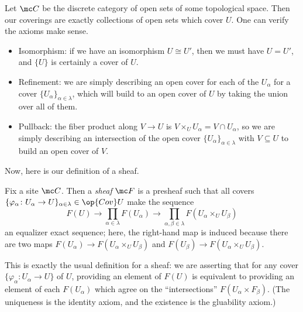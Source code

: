 \documentclass[../notes.tex]{subfiles}
\begin{document}
\begin{example}
	Let $\mc C$ be the discrete category of open sets of some topological space. Then our coverings are exactly collections of open sets which cover $U$. One can verify the axioms make sense.
	\begin{itemize}
		\item Isomorphism: if we have an isomorphism $U\cong U'$, then we must have $U=U'$, and $\{U\}$ is certainly a cover of $U$.
		\item Refinement: we are simply describing an open cover for each of the $U_\alpha$ for a cover $\{U_\alpha\}_{\alpha\in\lambda}$, which will build to an open cover of $U$ by taking the union over all of them.
		\item Pullback: the fiber product along $V\to U$ is $V\times_UU_\alpha=V\cap U_\alpha$, so we are simply describing an intersection of the open cover $\{U_\alpha\}_{\alpha\in\lambda}$ with $V\subseteq U$ to build an open cover of $V$.
	\end{itemize}
\end{example}
Now, here is our definition of a sheaf.
\begin{definition}[sheaf]
	Fix a site $\mc C$. Then a \textit{sheaf} $\mc F$ is a presheaf such that all covers $\{\varphi_\alpha\colon U_\alpha\to U\}_{\alpha\in\lambda}\in\op{Cov}U$ make the sequence
	\[F(U)\to\prod_{\alpha\in\lambda}F(U_\alpha)\to\prod_{\alpha,\beta\in\lambda}F(U_\alpha\times_UU_\beta)\]
	an equalizer exact sequence; here, the right-hand map is induced because there are two maps $F(U_\alpha)\to F(U_\alpha\times_UU_\beta)$ and $F(U_\beta)\to F(U_\alpha\times_UU_\beta)$.
\end{definition}
This is exactly the usual definition for a sheaf: we are asserting that for any cover $\{\varphi_\alpha\colon U_\alpha\to U\}$ of $U$, providing an element of $F(U)$ is equivalent to providing an element of each $F(U_\alpha)$ which agree on the ``intersections'' $F(U_\alpha\times F_\beta)$. (The uniqueness is the identity axiom, and the existence is the gluability axiom.)
\end{document}
